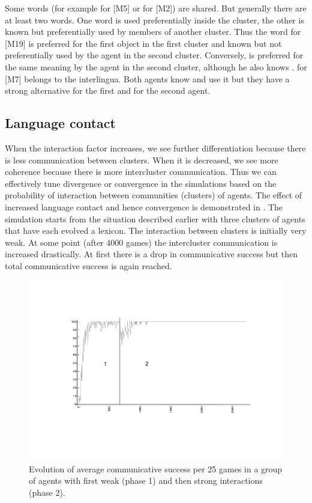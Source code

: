 Some words (for example  for [M5] or  for [M2]) are
shared. But generally 
there are at least two words. One word is used preferentially inside the cluster,
the other is known but preferentially used by members of another cluster. Thus
the word  for [M19] is preferred for the first object in the first
cluster and known but not preferentially used by the agent in the second cluster.
Conversely,  is preferred for the same meaning by the agent in the second
cluster, although he also knows .
 for [M7] belongs to the interlingua. Both agents
know and use it but they have a strong alternative  for 
the first and  for the second agent. 

\subsection{Language contact}

When the interaction factor increases, we see further differentiation because
there is less communication between clusters. When it is decreased, we see more
coherence because there is more intercluster communication. Thus we can
effectively tune divergence or convergence in the simulations
based on the probability of interaction
between communities (clusters) of agents. The effect of 
increased language contact and hence convergence is demonstrated in 
. 
The simulation starts from the situation described earlier with three 
clusters of agents that have each evolved a lexicon. 
The interaction between clusters is initially
very weak. At some point (after 4000 games) the intercluster communication is
increased drastically. At first there is a drop in communicative
success but then total communicative success is again reached.


\begin{figure}[htbp]
  \centerline{\includegraphics[width=\textwidth]{chap5/figs/comm-succ.pdf}}
\caption{Evolution of average communicative success per 25 games
in a group of agents with first weak (phase 1) and then strong
interactions (phase 2).}
\label{figure-communicative-success-in-space}
\end{figure}

